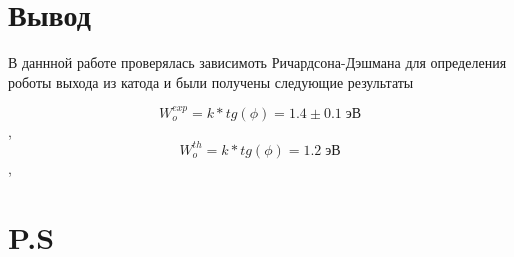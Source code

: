 \documentclass[a4paper, 12pt]{article}
\begin{document}


\section{Вывод}

В даннной работе проверялась зависимоть Ричардсона-Дэшмана для определения роботы выхода из катода
и были получены следующие результаты

$$W_o^{exp} = k * tg(\phi)  = 1.4 \pm 0.1\; \text{эВ}$$,
$$W_o^{th} = k * tg(\phi)  = 1.2 \; \text{эВ}$$,

\newpage

\section{P.S}
\end{document}
